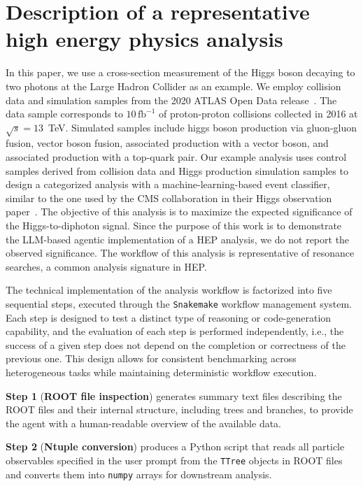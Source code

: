 \documentclass[aps,prd,reprint,superscriptaddress]{revtex4-2}
\begin{document}
\section{Description of a representative high energy physics analysis}\label{sec:description_HEP_analysis}
In this paper, we use a cross-section measurement of the Higgs boson decaying to two photons at the Large Hadron Collider as an example. We employ collision data and simulation samples from the 2020 ATLAS Open Data release~\citep{ATLAS2020SimSamples}. The data sample corresponds to $10\,\mathrm{fb}^{-1}$ of proton-proton collisions collected in 2016 at $\sqrt{s} = 13$~TeV. Simulated samples include higgs boson production via gluon-gluon fusion, vector boson fusion, associated production with a vector boson, and associated production with a top-quark pair. Our example analysis uses control samples derived from collision data and Higgs production simulation samples to design a categorized analysis with a machine-learning-based event classifier, similar to the one used by the CMS collaboration in their Higgs observation paper~\citep{CMS:2012qbp}. The objective of this analysis is to maximize the expected significance of the Higgs-to-diphoton signal. Since the purpose of this work is to demonstrate the LLM-based agentic implementation of a HEP analysis, we do not report the observed significance. The workflow of this analysis is representative of resonance searches, a common analysis signature in HEP. 

The technical implementation of the analysis workflow is factorized into five sequential steps, executed through the \texttt{Snakemake} workflow management system. Each step is designed to test a distinct type of reasoning or code-generation capability, and the evaluation of each step is performed independently, i.e., the success of a given step does not depend on the completion or correctness of the previous one. This design allows for consistent benchmarking across heterogeneous tasks while maintaining deterministic workflow execution.

\textbf{Step 1} (\textbf{ROOT file inspection}) generates summary text files describing the ROOT files and their internal structure, including trees and branches, to provide the agent with a human-readable overview of the available data.

\textbf{Step 2} (\textbf{Ntuple conversion}) produces a Python script that reads all particle observables specified in the user prompt from the \texttt{TTree} objects in ROOT files~\citep{Antcheva:2009zz} and converts them into \texttt{numpy} arrays for downstream analysis.
\end{document}
